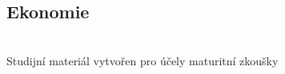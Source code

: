 \documentclass[../main.tex]{subfiles}
\begin{document}
\fontsize{10pt}{10pt}\selectfont\setlength\parindent{0em}
\pagestyle{empty}
\pagecolor{MPC}
\vspace{\fill}

\begin{center}
{\color{white}
\part{Ekonomie}
}
{\color{white}\LARGE \WSauthor}\\
\vspace*{1em}
{\color{white}\Large Studijní materiál vytvořen pro účely maturitní zkoušky}
\end{center}


\newpage
\pagecolor{white}

\blankpage

\newpage
\end{document}
